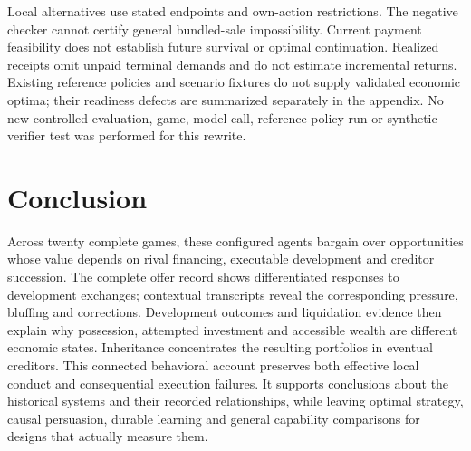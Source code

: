 Local alternatives use stated endpoints and own-action restrictions. The negative checker cannot certify general bundled-sale impossibility. Current payment feasibility does not establish future survival or optimal continuation. Realized receipts omit unpaid terminal demands and do not estimate incremental returns. Existing reference policies and scenario fixtures do not supply validated economic optima; their readiness defects are summarized separately in the appendix. No new controlled evaluation, game, model call, reference-policy run or synthetic verifier test was performed for this rewrite.

\section{Conclusion}

Across twenty complete games, these configured agents bargain over opportunities whose value depends on rival financing, executable development and creditor succession. The complete offer record shows differentiated responses to development exchanges; contextual transcripts reveal the corresponding pressure, bluffing and corrections. Development outcomes and liquidation evidence then explain why possession, attempted investment and accessible wealth are different economic states. Inheritance concentrates the resulting portfolios in eventual creditors. This connected behavioral account preserves both effective local conduct and consequential execution failures. It supports conclusions about the historical systems and their recorded relationships, while leaving optimal strategy, causal persuasion, durable learning and general capability comparisons for designs that actually measure them.
